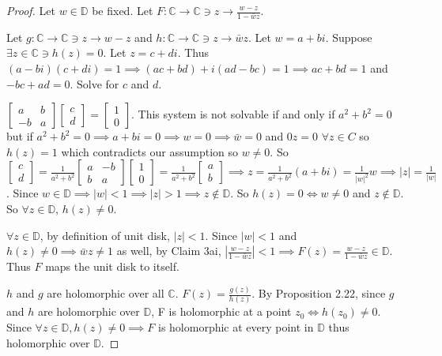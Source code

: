 \documentclass{article}
\newcommand{\C}{\mathbb{C}}
\newcommand{\abs}[1]{\left\lvert #1\right\rvert}
\begin{document}
\begin{proof}
    Let $w \in \mathbb{D}$ be fixed. Let $F: \C \to \C \ni z \to \frac{w - z}{1 - \bar{w}z}$.

    Let $g: \C \to \C \ni z \to w - z$ and $h: \C \to \C \ni z \to \bar{w}z$. Let $w = a + bi$. Suppose $\exists z \in \C \ni h(z) = 0 $. Let $z = c + di$. Thus $(a - bi)(c + di) = 1 \implies (ac + bd) + i(ad - bc) = 1 \implies ac + bd = 1$ and $-bc + ad = 0$. Solve for $c$ and $d$.
    
    $\begin{bmatrix}
        a & b \\ -b & a
    \end{bmatrix}\begin{bmatrix}
        c \\ d
    \end{bmatrix} = \begin{bmatrix}
        1 \\ 0
    \end{bmatrix}$. This system is not solvable if and only if $a^2 + b^2 = 0$ but if $a^2 + b^2 = 0 \implies a + bi = 0 \implies w = 0 \implies \bar{w} = 0$ and $0z = 0$ $\forall z \in C$ so $h(z) = 1$ which contradicts our assumption so $w \neq 0$. So $\begin{bmatrix}
        c \\ d
    \end{bmatrix} = \frac{1}{a^2 + b^2}\begin{bmatrix}
        a & -b \\ b & a
    \end{bmatrix}\begin{bmatrix}
        1 \\ 0
    \end{bmatrix} = \frac{1}{a^2 + b^2} \begin{bmatrix}
        a \\ b
    \end{bmatrix} \implies z = \frac{1}{a^2 + b^2}(a + bi) = \frac{1}{|w|^2}w \implies |z| = \frac{1}{|w|}$. Since $w \in \mathbb{D} \implies |w| < 1 \implies |z| > 1 \implies z \not \in \mathbb{D}$. So $h(z) = 0 \iff w \neq 0$ and $z \not \in \mathbb{D}$. So $\forall z \in \mathbb{D}$, $h(z) \neq 0$.
    
    $\forall z \in \mathbb{D}$, by definition of unit disk, $|z| < 1$. Since $|w| < 1$ and $h(z) \neq 0 \implies \bar{w}z \neq 1$ as well, by Claim 3ai, $\abs{\frac{w - z}{1 - \bar{w}z}} < 1 \implies F(z) = \frac{w - z}{1 - \bar{w}z} \in \mathbb{D}$. Thus $F$ maps the unit disk to itself.
    
    $h$ and $g$ are holomorphic over all $\C$. $F(z) = \frac{g(z)}{h(z)}$. By Proposition 2.22, since $g$ and $h$ are holomorphic over $\mathbb{D}$, F is holomorphic at a point $z_0 \iff h(z_0) \neq 0$. Since $\forall z \in \mathbb{D}, h(z) \neq 0 \implies F$ is holomorphic at every point in $\mathbb{D}$ thus holomorphic over $\mathbb{D}$.            
\end{proof}
\end{document}
